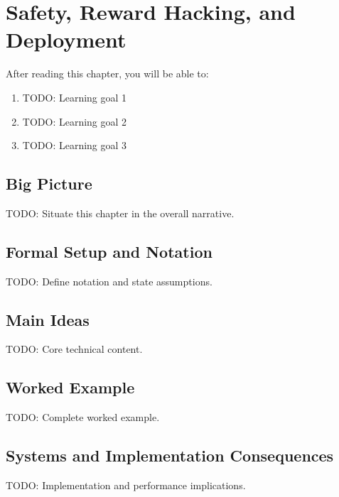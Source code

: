 \chapter{Safety, Reward Hacking, and Deployment}
\label{ch:26}

\begin{keyinsight}
After reading this chapter, you will be able to:
\begin{enumerate}
  \item TODO: Learning goal 1
  \item TODO: Learning goal 2
  \item TODO: Learning goal 3
\end{enumerate}
\end{keyinsight}

\section{Big Picture}
\label{ch:26:sec:big_picture}

TODO: Situate this chapter in the overall narrative.

\section{Formal Setup and Notation}
\label{ch:26:sec:setup}

TODO: Define notation and state assumptions.

\section{Main Ideas}
\label{ch:26:sec:main}

TODO: Core technical content.

\section{Worked Example}
\label{ch:26:sec:example}

TODO: Complete worked example.

\section{Systems and Implementation Consequences}
\label{ch:26:sec:systems}

TODO: Implementation and performance implications.

